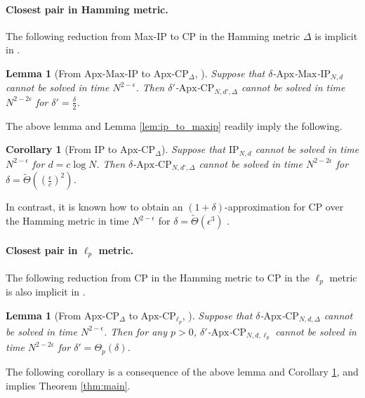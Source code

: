 \documentclass[11pt]{article}
\theoremstyle{plain}
\newtheorem{lem}[thm]{Lemma}
\newtheorem{cor}[thm]{Corollary}
\theoremstyle{remark}
\newcommand{\IP}{\mathrm{IP}}
\newcommand{\Max}{\mathrm{Max}}
\newcommand{\CP}{\mathrm{CP}}
\newcommand{\Apx}{\mathrm{Apx}}
\begin{document}
\paragraph{Closest pair in Hamming metric.}

The following reduction from Max-IP to CP in the  Hamming metric $\Delta$ is implicit in \cite{Rub18}.

\begin{lem}[From $\Apx$-$\Max$-$\IP$ to $\Apx$-$\CP_{\Delta}$, \cite{Rub18}]\label{lem:maxip_to_hamming}
Suppose that $\delta$-$\Apx$-$\Max$-$\IP_{N,d}$ cannot be solved in time $N^{2-\epsilon}$. Then 
$\delta'$-$\Apx$-$\CP_{N,d',\Delta}$ cannot be solved in time $N^{2-2\epsilon}$ for 
$\delta' = \frac \delta 2$. 
\end{lem}

The above lemma and Lemma  \ref{lem:ip_to_maxip} readily imply the following.

\begin{cor}[From $\IP$ to $\Apx$-$\CP_{\Delta}$]\label{cor:ApxCP}
Suppose that $\IP_{N,d}$ cannot be solved in time $N^{2-\epsilon}$ for $d = c \log N$. Then $\delta$-$\Apx$-$\CP_{N,d',\Delta}$ cannot be solved in time $N^{2-2\epsilon}$ for 
$\delta = \tilde \Theta( ( \frac \epsilon c)^2) $.
\end{cor}


In contrast, it is known how to obtain an $(1+\delta)$-approximation for CP over the Hamming metric in time $N^{2-\epsilon}$ for $\delta = \tilde \Theta( \epsilon^{3})$ \cite{ACW16}.

\paragraph{Closest pair in $\ell_p$ metric.}

The following reduction from CP in the Hamming metric to CP in the  $\ell_p$ metric  is also implicit in \cite{Rub18}.

\begin{lem}[From $\Apx$-$\CP_{\Delta}$ to $\Apx$-$\CP_{\ell_p}$, \cite{Rub18}] \label{lem:hamtolp}
    Suppose that $\delta$-$\Apx$-$\CP_{N, d, \Delta}$ cannot be solved in time $N^{2-\epsilon}$. Then for any $p>0$, $\delta'$-$\Apx$-$\CP_{N,d,\ell_p}$ cannot be solved in time $N^{2-2\epsilon}$ for $\delta' = \Theta_p(\delta)$.
\end{lem}

The following corollary is a consequence of the above lemma and Corollary \ref{cor:ApxCP}, and implies Theorem \ref{thm:main}.
\end{document}

